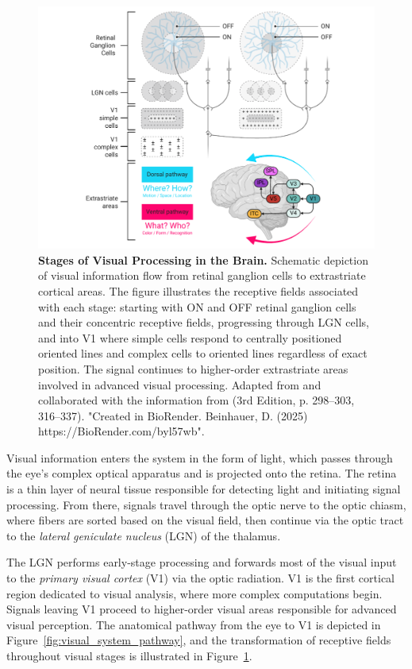 \begin{figure}
    \centering
    \includegraphics[width=\linewidth]{img/early_visual_processing.pdf}
    \caption{\textbf{Stages of Visual Processing in the Brain.} Schematic depiction of visual information flow from retinal ganglion cells to extrastriate cortical areas. The figure illustrates the receptive fields associated with each stage: starting with ON and OFF retinal ganglion cells and their concentric receptive fields, progressing through LGN cells, and into V1 where simple cells respond to centrally positioned oriented lines and complex cells to oriented lines regardless of exact position. The signal continues to higher-order extrastriate areas involved in advanced visual processing. Adapted from \citet{felleman_distributed_1991} and collaborated with the information from \citet{bear2020neuroscience} (3rd Edition, p. 298--303, 316--337). "Created in BioRender. Beinhauer, D. (2025) https://BioRender.com/byl57wb".}
    \label{fig:early_vis_processing}
\end{figure}

Visual information enters the system in the form of light, which passes through the eye's complex optical apparatus and is projected onto the retina. The retina is a thin layer of neural tissue responsible for detecting light and initiating signal processing. From there, signals travel through the optic nerve to the optic chiasm, where fibers are sorted based on the visual field, then continue via the optic tract to the \emph{lateral geniculate nucleus} (LGN) of the thalamus.

The LGN performs early-stage processing and forwards most of the visual input to the \emph{primary visual cortex} (V1) via the optic radiation. V1 is the first cortical region dedicated to visual analysis, where more complex computations begin. Signals leaving V1 proceed to higher-order visual areas responsible for advanced visual perception. The anatomical pathway from the eye to V1 is depicted in Figure~\ref{fig:visual_system_pathway}, and the transformation of receptive fields throughout visual stages is illustrated in Figure~\ref{fig:early_vis_processing}.

